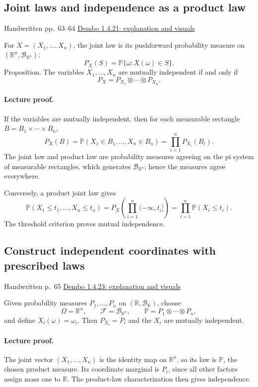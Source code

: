\documentclass[11pt,letterpaper]{article}
\newcommand{\lecturesection}[1]{\subsection{#1}}
\begin{document}
\hypertarget{l7-s11}{}
\lecturesection{Joint laws and independence as a product law}
{\small\textcolor{lectureink}{Handwritten pp.\ 63--64} \quad \href{https://josephrbailey.com/probability/\#entry-1-4-21}{Dembo 1.4.21: explanation and visuals}}

For $X=(X_1,\ldots,X_n)$, the joint law is its pushforward probability measure on $(\mathbb R^n,\mathcal B_{\mathbb R^n})$: \[P_X(S)=\mathbb P\{\omega:X(\omega)\in S\}.\] Proposition. The variables $X_1,\ldots,X_n$ are mutually independent if and only if \[P_X=P_{X_1}\otimes\cdots\otimes P_{X_n}.\]

\paragraph{Lecture proof.}
If the variables are mutually independent, then for each measurable rectangle $B=B_1\times\cdots\times B_n$, \[P_X(B)=\mathbb P(X_1\in B_1,\ldots,X_n\in B_n)=\prod_{i=1}^nP_{X_i}(B_i).\] The joint law and product law are probability measures agreeing on the pi system of measurable rectangles, which generates $\mathcal B_{\mathbb R^n}$; hence the measures agree everywhere.

Conversely, a product joint law gives \[\mathbb P(X_1\le t_1,\ldots,X_n\le t_n)=P_X\left(\prod_{i=1}^n({-\infty},t_i]\right)=\prod_{i=1}^n\mathbb P(X_i\le t_i).\] The threshold criterion proves mutual independence.

\hypertarget{l7-s12}{}
\lecturesection{Construct independent coordinates with prescribed laws}
{\small\textcolor{lectureink}{Handwritten p.\ 65} \quad \href{https://josephrbailey.com/probability/\#entry-1-4-23}{Dembo 1.4.23: explanation and visuals}}

Given probability measures $P_1,\ldots,P_n$ on $(\mathbb R,\mathcal B_{\mathbb R})$, choose \[\Omega=\mathbb R^n,\qquad\mathcal F=\mathcal B_{\mathbb R^n},\qquad\mathbb P=P_1\otimes\cdots\otimes P_n,\] and define $X_i(\omega)=\omega_i$. Then $P_{X_i}=P_i$ and the $X_i$ are mutually independent.

\paragraph{Lecture proof.}
The joint vector $(X_1,\ldots,X_n)$ is the identity map on $\mathbb R^n$, so its law is $\mathbb P$, the chosen product measure. Its coordinate marginal is $P_i$, since all other factors assign mass one to $\mathbb R$. The product-law characterization then gives independence.
\end{document}
